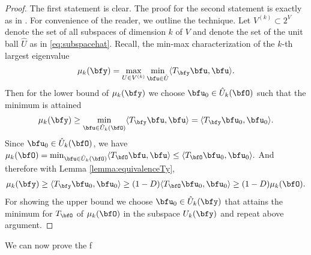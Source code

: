 \begin{proof} The first statement is clear. The proof for the second statement is exactly as in \cite[Proposition 1]{grubišić2021stochasticcollocationmethodcomputing}. For convenience of the reader, we outline the technique. Let $V^{(k)} \subset 2^V$ denote the set of all subspaces of dimension $k$ of $V$ and denote the set of the unit ball $\hat U$ as in \eqref{eq:subspacehat}.
    Recall, the min-max characterization of the $k$-th largest eigenvalue
    \begin{align*}
        \mu_k(\bfy) = \max_{U \in V^{(k)}} \min_{\bfu \in \hat U} \langle T_{\bfy} \bfu ,\bfu \rangle.
    \end{align*}
    Then for the lower bound of $\mu_k(\bfy) $ we choose $\bfu_0 \in \hat U_k(\bfO)$ such that the minimum is attained
    \begin{align*}
        \mu_k(\bfy) \geq \min_{ \bfu \in \hat U_{k} (\bfO)} \langle T_{\bfy} \bfu ,\bfu \rangle = \langle T_{\bfy} \bfu_0 ,\bfu_0 \rangle.
    \end{align*}
    Since $\bfu_0 \in \hat U_k (\bfO)$, we have $ \mu_k(\bfO) =  \min_{ \bfu \in \hat U_{k} (\bfO)} \langle T_{\bfO} \bfu ,\bfu \rangle \leq \langle T_{\bfO} \bfu_0,\bfu_0 \rangle. $  And therefore with Lemma \ref{lemma:equivalenceTy},
    \begin{align*}
        \mu_k(\bfy) \geq  \langle T_{\bfy} \bfu_0, \bfu_0 \rangle \geq (1-D) \langle T_{\bfO} \bfu_0 , \bfu_0 \rangle \geq (1-D) \mu_k(\bfO).
    \end{align*}
    For showing the upper bound we choose $\bfu_0 \in \hat U_k(\bfy)$ that attains the minimum for $T_{\bfO}$ of $\mu_k(\bfO)$ in the subspace $U_k(\bfy)$ and repeat above argument.
\end{proof}
We can now prove the f



